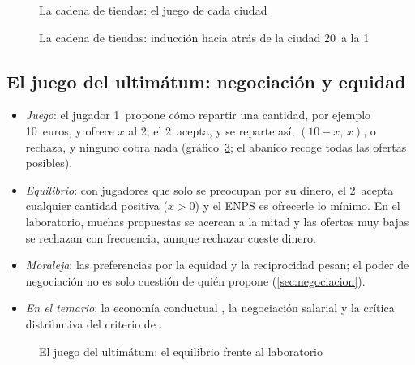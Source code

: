 \documentclass[11pt]{article}
\begin{document}
\begin{figure}[H]
\centering
\caption{La cadena de tiendas: el juego de cada ciudad}\label{fig:cadena-tiendas}
\end{figure}
\begin{figure}[H]
\centering
\caption{La cadena de tiendas: inducción hacia atrás de la ciudad 20~a la 1}\label{fig:cadena-induccion}
\end{figure}

\subsection*{El juego del ultimátum: negociación y equidad}

\begin{itemize}
\item \emph{Juego}\nocite{GuthSchmittbergerSchwarze1982Ultimatum}: el jugador 1~propone cómo repartir una cantidad, por ejemplo 10~euros, y ofrece $x$ al 2; el 2~acepta, y se reparte así, $(10-x,\,x)$, o rechaza, y ninguno cobra nada (gráfico~\ref{fig:ultimatum}; el abanico recoge todas las ofertas posibles).
\item \emph{Equilibrio}: con jugadores que solo se preocupan por su dinero, el 2~acepta cualquier cantidad positiva ($x>0$) y el ENPS es ofrecerle lo mínimo. En el laboratorio, muchas propuestas se acercan a la mitad y las ofertas muy bajas se rechazan con frecuencia, aunque rechazar cueste dinero.
\item \emph{Moraleja}: las preferencias por la equidad y la reciprocidad pesan; el poder de negociación no es solo cuestión de quién propone (\ref{sec:negociacion}).
\item \emph{En el temario}: la economía conductual , la negociación salarial  y la crítica distributiva del criterio de  .
\end{itemize}

\begin{figure}[H]
\centering
\caption{El juego del ultimátum: el equilibrio frente al laboratorio}\label{fig:ultimatum}
\end{figure}
\end{document}
